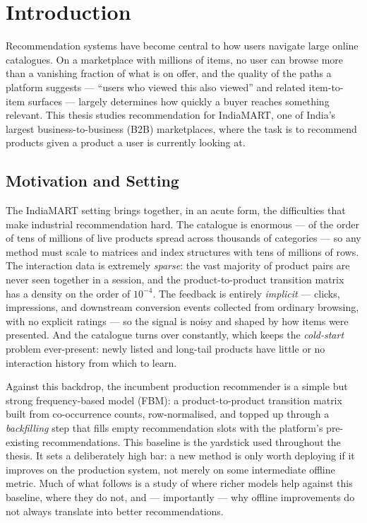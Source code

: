 \chapter{Introduction}
\label{ch:introduction}

Recommendation systems have become central to how users navigate large online
catalogues. On a marketplace with millions of items, no user can browse more than
a vanishing fraction of what is on offer, and the quality of the paths a platform
suggests --- ``users who viewed this also viewed'' and related item-to-item
surfaces --- largely determines how quickly a buyer reaches something relevant.
This thesis studies recommendation for IndiaMART, one of India's largest
business-to-business (B2B) marketplaces, where the task is to recommend products
given a product a user is currently looking at.

\section{Motivation and Setting}
\label{sec:intro-setting}

The IndiaMART setting brings together, in an acute form, the difficulties that
make industrial recommendation hard. The catalogue is enormous --- of the order
of tens of millions of live products spread across thousands of categories --- so
any method must scale to matrices and index structures with tens of millions of
rows. The interaction data is extremely \emph{sparse}: the vast majority of
product pairs are never seen together in a session, and the product-to-product
transition matrix has a density on the order of $10^{-4}$. The feedback is
entirely \emph{implicit} --- clicks, impressions, and downstream conversion
events collected from ordinary browsing, with no explicit ratings --- so the
signal is noisy and shaped by how items were presented. And the catalogue turns
over constantly, which keeps the \emph{cold-start} problem ever-present: newly
listed and long-tail products have little or no interaction history from which to
learn.

Against this backdrop, the incumbent production recommender is a simple but
strong frequency-based model (FBM): a product-to-product transition matrix built
from co-occurrence counts, row-normalised, and topped up through a
\emph{backfilling} step that fills empty recommendation slots with the platform's
pre-existing recommendations. This baseline is the yardstick used throughout the
thesis. It sets a deliberately high bar: a new method is only worth deploying if
it improves on the production system, not merely on some intermediate offline
metric. Much of what follows is a study of where richer models help against this
baseline, where they do not, and --- importantly --- why offline improvements do
not always translate into better recommendations.

